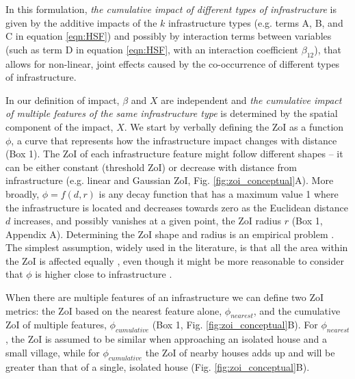 \documentclass[titlepage]{article}
\begin{document}
In this formulation, \textit{the cumulative impact of different types of infrastructure} is given by the additive impacts of the $k$ infrastructure types (e.g. terms A, B, and C in equation \ref{eqn:HSF}) and possibly by interaction terms between variables (such as term D in equation \ref{eqn:HSF}, with an interaction coefficient $\beta_{12}$), that allows for non-linear, joint effects caused by the co-occurrence of different types of infrastructure. 

In our definition of impact, $\beta$ and $X$ are independent and \textit{the cumulative impact of multiple features of the same infrastructure type} is determined by the spatial component of the impact, $X$. We start by verbally defining the ZoI as a function $\phi$, a curve that represents how the infrastructure impact changes with distance (Box 1). The ZoI of each infrastructure feature might follow different shapes -- it can be either constant (threshold ZoI) or decrease with distance from infrastructure (e.g. linear and Gaussian ZoI, Fig. \ref{fig:zoi_conceptual}A). More broadly, $\phi = f(d, r)$ is any decay function that has a maximum value 1 where the infrastructure is located and decreases towards zero as the Euclidean distance $d$ increases, and possibly vanishes at a given point, the ZoI radius $r$ (Box 1, Appendix A). Determining the ZoI shape and radius is an empirical problem \citep{miguet_how_2017}. The simplest assumption, widely used in the literature, is that all the area within the ZoI is affected equally \citep[a buffer zone around features; e.g][]{panzacchi_learning_2013}, even though it might be more reasonable to consider that $\phi$ is higher close to infrastructure \citep[][]{skarin_out_2018, zeller_multi-level_2017}. 

When there are multiple features of an infrastructure we can define two ZoI metrics: the ZoI based on the nearest feature alone, $\phi_{nearest}$, and the cumulative ZoI of multiple features, $\phi_{cumulative}$ (Box 1, Fig. \ref{fig:zoi_conceptual}B). For $\phi_{nearest}$, the ZoI is assumed to be similar when approaching an isolated house and a small village, while for $\phi_{cumulative}$ the ZoI of nearby houses adds up and will be greater than that of a single, isolated house (Fig. \ref{fig:zoi_conceptual}B).
\end{document}
